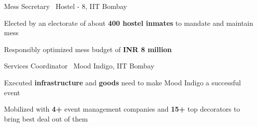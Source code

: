 \begin{cventries}
    \cventry
    {}
    {Mess Secretary \textbar \ Hostel - 8, IIT Bombay}
    {\color{darkgray}{(August'17 - April'18)}}
    {}
    {
      \begin{cvitems}
        \item{Elected by an electorate of about \textbf{400 hostel inmates} to mandate and maintain mess}
        \item{Responsibly optimized mess budget of \textbf{INR 8 million}}
      \end{cvitems}
    }
    \cventry
    {}
    {Services Coordinator \textbar \ Mood Indigo, IIT Bombay}
    {\color{darkgray}{(May’17 - January’18)}}
    {}
    {
      \begin{cvitems}
        \item{Executed \textbf{infrastructure} and \textbf{goods} need to make Mood Indigo a successful event}
        \item{Mobilized with \textbf{4+} event management companies and \textbf{15+} top decorators to bring best deal out of them}
      \end{cvitems}
    }
\end{cventries}
